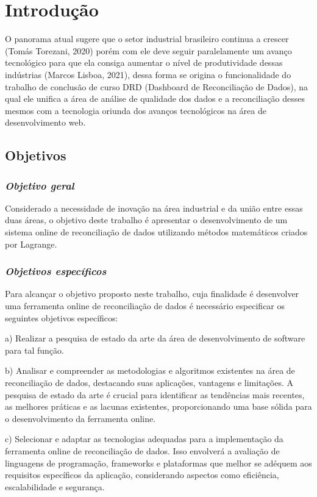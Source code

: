 \chapter{Introdução} \label{Introducao}

O panorama atual sugere que o setor industrial brasileiro continua a crescer (Tomás Torezani, 2020) porém com ele deve seguir paralelamente um avanço tecnológico para que ela consiga aumentar o nível de produtividade dessas indústrias (Marcos Lisboa, 2021), dessa forma se origina o funcionalidade do trabalho de conclusão de curso DRD (Dashboard de Reconciliação de Dados), na qual ele unifica a área de análise de qualidade dos dados e a reconciliação desses mesmos com a tecnologia oriunda dos avanços tecnológicos na área de desenvolvimento web.

\section{Objetivos}

\subsection{\textit{Objetivo geral}}

Considerado a necessidade de inovação na área industrial e da união entre essas duas áreas, o objetivo deste trabalho é apresentar o desenvolvimento de um sistema online de reconciliação de dados utilizando métodos matemáticos criados por Lagrange.

\subsection{\textit{Objetivos específicos}}

Para alcançar o objetivo proposto neste trabalho, cuja finalidade é desenvolver uma ferramenta online de reconciliação de dados é necessário especificar os seguintes objetivos específicos:

a) Realizar a pesquisa de estado da arte da área de desenvolvimento de software para tal função.

b) Analisar e compreender as metodologias e algoritmos existentes na área de reconciliação de dados, destacando suas aplicações, vantagens e limitações. A pesquisa de estado da arte é crucial para identificar as tendências mais recentes, as melhores práticas e as lacunas existentes, proporcionando uma base sólida para o desenvolvimento da ferramenta online.

c) Selecionar e adaptar as tecnologias adequadas para a implementação da ferramenta online de reconciliação de dados. Isso envolverá a avaliação de linguagens de programação, frameworks e plataformas que melhor se adéquem aos requisitos específicos da aplicação, considerando aspectos como eficiência, escalabilidade e segurança.

